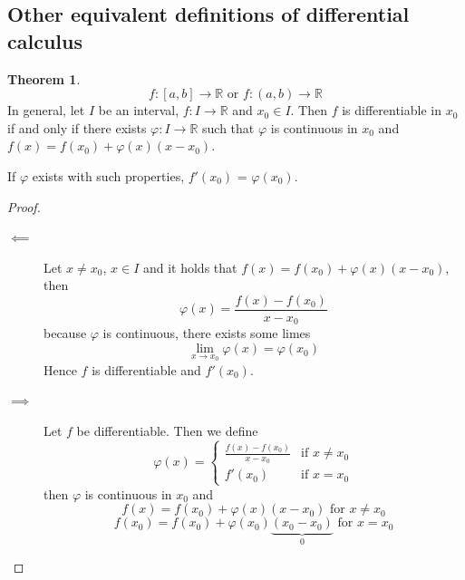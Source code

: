 \documentclass[a4paper,landscape,twocolumn]{article}
\theoremstyle{definition}
\newtheorem{theorem}{Theorem}
\begin{document}
\subsection{Other equivalent definitions of differential calculus}
%
\begin{theorem}
  \[ f: [a,b] \to \mathbb R \text{ or } f: (a, b) \to \mathbb R \]
  In general, let $I$ be an interval, $f: I \to \mathbb R$
  and $x_0 \in I$. Then $f$ is differentiable in $x_0$ if and only if
  there exists $\varphi: I \to \mathbb R$ such that $\varphi$ is continuous in $x_0$
  and $f(x) = f(x_0) + \varphi(x)(x - x_0)$.

  If $\varphi$ exists with such properties, $f'(x_0)$ = $\varphi(x_0)$.
\end{theorem}
\begin{proof}
  \begin{description}
    \item[$\impliedby$]
      Let $x \neq x_0$, $x \in I$ and it holds that $f(x) = f(x_0) + \varphi(x)(x - x_0)$, then
      \[ \varphi(x) = \frac{f(x) - f(x_0)}{x - x_0} \]
      because $\varphi$ is continuous, there exists some limes
      \[ \lim_{x \to x_0} \varphi(x) = \varphi(x_0) \]
      Hence $f$ is differentiable and $f'(x_0)$.
    \item[$\implies$]
      Let $f$ be differentiable. Then we define
      \[
        \varphi(x) = \begin{cases}
          \frac{f(x) - f(x_0)}{x - x_0} & \text{if } x \neq x_0 \\
          f'(x_0) & \text{if } x = x_0
        \end{cases}
      \]
      then $\varphi$ is continuous in $x_0$ and
      \[ f(x) = f(x_0) + \varphi(x)(x - x_0) \text{ for } x \neq x_0 \]
      \[ f(x_0) = f(x_0) + \varphi(x_0)\underbrace{(x_0 - x_0)}_{0} \text{ for } x = x_0 \]
  \end{description}
\end{proof}
\end{document}
